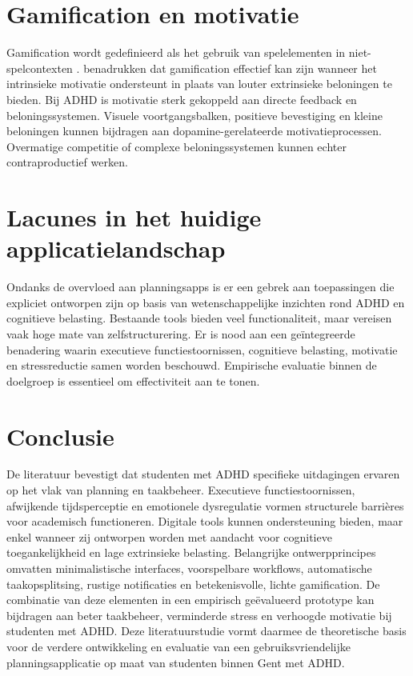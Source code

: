\section{Gamification en motivatie}
Gamification wordt gedefinieerd als het gebruik van spelelementen in niet-spelcontexten \autocite{Deterding2011}. \textcite{Mekler2021} benadrukken dat gamification effectief kan zijn wanneer het intrinsieke motivatie ondersteunt in plaats van louter extrinsieke beloningen te bieden. Bij ADHD is motivatie sterk gekoppeld aan directe feedback en beloningssystemen. Visuele voortgangsbalken, positieve bevestiging en kleine beloningen kunnen bijdragen aan dopamine-gerelateerde motivatieprocessen. Overmatige competitie of complexe beloningssystemen kunnen echter contraproductief werken.

\section{Lacunes in het huidige applicatielandschap}
Ondanks de overvloed aan planningsapps is er een gebrek aan toepassingen die expliciet ontworpen zijn op basis van wetenschappelijke inzichten rond ADHD en cognitieve belasting. Bestaande tools bieden veel functionaliteit, maar vereisen vaak hoge mate van zelfstructurering. Er is nood aan een geïntegreerde benadering waarin executieve functiestoornissen, cognitieve belasting, motivatie en stressreductie samen worden beschouwd. Empirische evaluatie binnen de doelgroep is essentieel om effectiviteit aan te tonen.

\section{Conclusie}
De literatuur bevestigt dat studenten met ADHD specifieke uitdagingen ervaren op het vlak van planning en taakbeheer. Executieve functiestoornissen, afwijkende tijdsperceptie en emotionele dysregulatie vormen structurele barrières voor academisch functioneren. Digitale tools kunnen ondersteuning bieden, maar enkel wanneer zij ontworpen worden met aandacht voor cognitieve toegankelijkheid en lage extrinsieke belasting. Belangrijke ontwerpprincipes omvatten minimalistische interfaces, voorspelbare workflows, automatische taakopsplitsing, rustige notificaties en betekenisvolle, lichte gamification. De combinatie van deze elementen in een empirisch geëvalueerd prototype kan bijdragen aan beter taakbeheer, verminderde stress en verhoogde motivatie bij studenten met ADHD. Deze literatuurstudie vormt daarmee de theoretische basis voor de verdere ontwikkeling en evaluatie van een gebruiksvriendelijke planningsapplicatie op maat van studenten binnen Gent met ADHD.